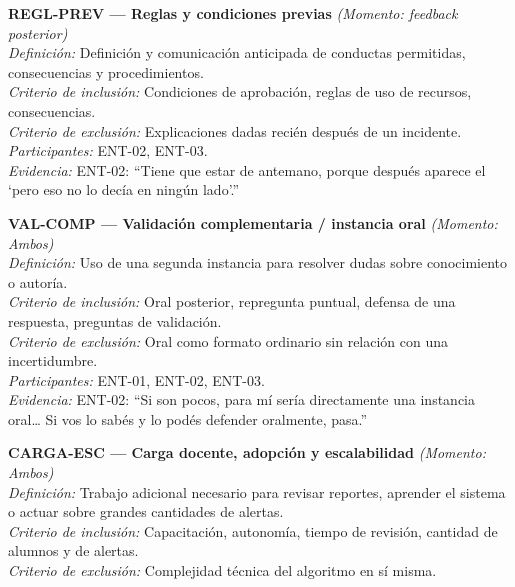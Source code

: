 \begin{center}
\vspace{2pt}
\begin{infobox}
\textbf{\textcolor{accent}{REGL-PREV --- Reglas y condiciones previas}} \textit{(Momento: \textit{feedback} posterior)}\\
\textit{Definición:} Definición y comunicación anticipada de conductas permitidas, consecuencias y procedimientos.\\
\textit{Criterio de inclusión:} Condiciones de aprobación, reglas de uso de recursos, consecuencias.\\
\textit{Criterio de exclusión:} Explicaciones dadas recién después de un incidente.\\
\textit{Participantes:} ENT-02, ENT-03.\\
\textit{Evidencia:} ENT-02: ``Tiene que estar de antemano, porque después aparece el `pero eso no lo decía en ningún lado'.''
\end{infobox}
\vspace{2pt}
\begin{infobox}
\textbf{\textcolor{accent}{VAL-COMP --- Validación complementaria / instancia oral}} \textit{(Momento: Ambos)}\\
\textit{Definición:} Uso de una segunda instancia para resolver dudas sobre conocimiento o autoría.\\
\textit{Criterio de inclusión:} Oral posterior, repregunta puntual, defensa de una respuesta, preguntas de validación.\\
\textit{Criterio de exclusión:} Oral como formato ordinario sin relación con una incertidumbre.\\
\textit{Participantes:} ENT-01, ENT-02, ENT-03.\\
\textit{Evidencia:} ENT-02: ``Si son pocos, para mí sería directamente una instancia oral… Si vos lo sabés y lo podés defender oralmente, pasa.''
\end{infobox}
\vspace{2pt}
\begin{infobox}
\textbf{\textcolor{accent}{CARGA-ESC --- Carga docente, adopción y escalabilidad}} \textit{(Momento: Ambos)}\\
\textit{Definición:} Trabajo adicional necesario para revisar reportes, aprender el sistema o actuar sobre grandes cantidades de alertas.\\
\textit{Criterio de inclusión:} Capacitación, autonomía, tiempo de revisión, cantidad de alumnos y de alertas.\\
\textit{Criterio de exclusión:} Complejidad técnica del algoritmo en sí misma.\\

\end{infobox}
\end{center}
